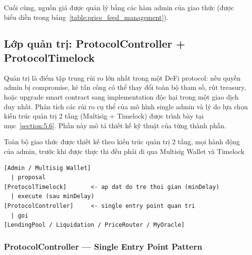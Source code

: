 \documentclass[../DoAn.tex]{subfiles}
\begin{document}
Cuối cùng, nguồn giá được quản lý bằng các hàm admin của giao thức (được biểu diễn trong bảng~\ref{table:price_feed_management}).

\begin{table}[H]
\centering
{}
\caption{Các hàm quản lý nguồn giá}
\label{table:price_feed_management}
\end{table}


\subsection{Lớp quản trị: ProtocolController + ProtocolTimelock}
\label{section:4.2.5}


Quản trị là điểm tập trung rủi ro lớn nhất trong một DeFi protocol: nếu quyền admin bị compromise, kẻ tấn công có thể thay đổi toàn bộ tham số, rút treasury, hoặc upgrade smart contract sang implementation độc hại trong một giao dịch duy nhất. Phân tích các rủi ro cụ thể của mô hình single admin và lý do lựa chọn kiến trúc quản trị 2 tầng (Multisig + Timelock) được trình bày tại mục~\ref{section:5.6}. Phần này mô tả thiết kế kỹ thuật của từng thành phần.

Toàn bộ giao thức được thiết kế theo kiến trúc quản trị 2 tầng, mọi hành động của admin, trước khi được thực thi đều phải đi qua Multisig Wallet và Timelock~\cite{SafeGlobalDocs,OpenZeppelinDocs}
\begin{lstlisting}
[Admin / Multisig Wallet]
  | proposal
[ProtocolTimelock]       <- ap dat do tre thoi gian (minDelay)
  | execute (sau minDelay)
[ProtocolController]     <- single entry point quan tri
  | goi
[LendingPool / Liquidation / PriceRouter / MyOracle]
\end{lstlisting}


\subsubsection{ProtocolController --- Single Entry Point Pattern}
\end{document}
